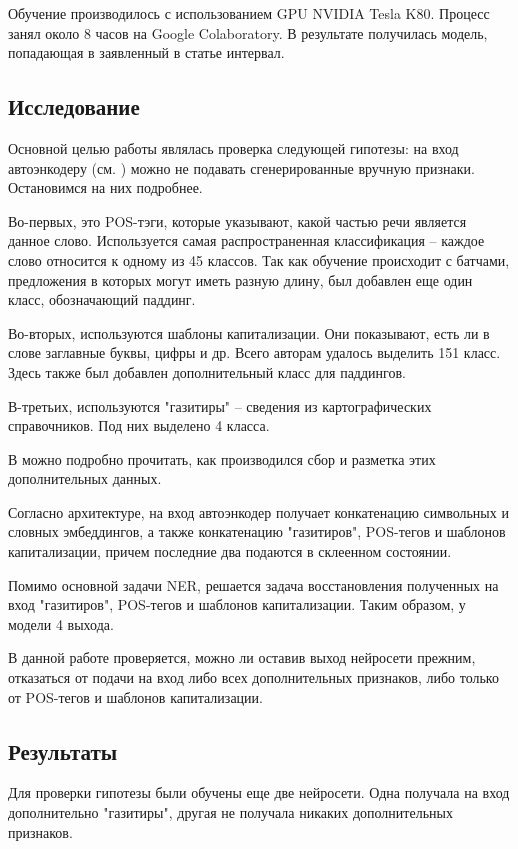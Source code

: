 \documentclass[a4paper,14pt]{extarticle}
\begin{document}
Обучение производилось с использованием GPU NVIDIA Tesla K80. Процесс занял около 8 часов на Google Colaboratory. В результате получилась модель, попадающая в заявленный в статье интервал.

\subsection{Исследование}

Основной целью работы являлась проверка следующей гипотезы: на вход автоэнкодеру (см. \cite{1808.09075}) можно не подавать сгенерированные вручную признаки. Остановимся на них подробнее.

Во-первых, это POS-тэги, которые указывают, какой частью речи является данное слово. Используется самая распространенная классификация -- каждое слово относится к одному из 45 классов. Так как обучение происходит с батчами, предложения в которых могут иметь разную длину, был добавлен еще один класс, обозначающий паддинг.

Во-вторых, используются шаблоны капитализации. Они показывают, есть ли в слове заглавные буквы, цифры и др. Всего авторам \cite{1808.09075} удалось выделить 151 класс. Здесь также был добавлен дополнительный класс для паддингов.

В-третьих, используются "газитиры" -- сведения из картографических справочников. Под них выделено 4 класса.

В \cite{1808.09075} можно подробно прочитать, как производился сбор и разметка этих дополнительных данных.

Согласно архитектуре, на вход автоэнкодер получает конкатенацию символьных и словных эмбеддингов, а также конкатенацию "газитиров", POS-тегов и шаблонов капитализации, причем последние два подаются в склеенном состоянии.

Помимо основной задачи NER, решается задача восстановления полученных на вход "газитиров", POS-тегов и шаблонов капитализации. Таким образом, у модели 4 выхода.

В данной работе проверяется, можно ли оставив выход нейросети прежним, отказаться от подачи на вход либо всех дополнительных признаков, либо только от POS-тегов и шаблонов капитализации.

\subsection{Результаты}

Для проверки гипотезы были обучены еще две нейросети. Одна получала на вход дополнительно "газитиры", другая не получала никаких дополнительных признаков.
\end{document}

